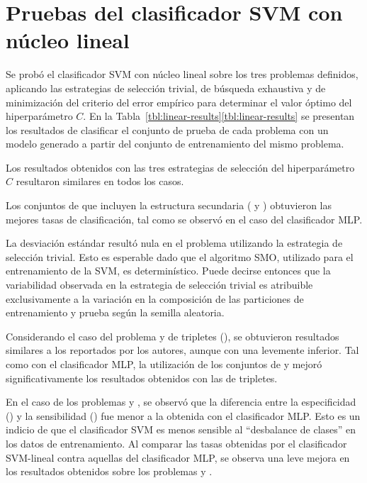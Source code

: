 %
%
%
\section{Pruebas del clasificador SVM con núcleo lineal}
%
Se probó el clasificador SVM con núcleo lineal sobre los tres
problemas definidos, aplicando las estrategias de selección trivial,
de búsqueda exhaustiva y de minimización del criterio del error
empírico para determinar el valor óptimo del hiperparámetro $C$.
En la \iflatexml{}Tabla~\ref{tbl:linear-results}\else\autoref{tbl:linear-results}\fi{}
se presentan los resultados de clasificar el conjunto de prueba de
cada problema con un modelo generado a partir del conjunto de
entrenamiento del mismo problema.

Los resultados obtenidos con las tres estrategias de selección del
hiperparámetro $C$ resultaron similares en todos los casos.

Los conjuntos de  que incluyen la estructura secundaria
( y ) obtuvieron las mejores tasas de clasificación,
tal como se observó en el caso del clasificador MLP.

La desviación estándar resultó nula en el problema \prob{\tripletsvm}
utilizando la estrategia de selección trivial.
Esto es esperable dado que el algoritmo SMO, utilizado para el
entrenamiento de la SVM, es determinístico.
Puede decirse entonces que la variabilidad observada en la estrategia
de selección trivial es atribuible exclusivamente a la variación en la
composición de las particiones de entrenamiento y prueba según la
semilla aleatoria.

Considerando el caso del problema \prob\tripletsvm{} y  de
tripletes (), se obtuvieron resultados similares a los
reportados por los autores, aunque con una \SP{} levemente inferior.
Tal como con el clasificador MLP, la utilización de los conjuntos de
  y  mejoró significativamente los
resultados obtenidos con las  de tripletes.

En el caso de los problemas \prob\mipred{} y \prob\micropred{}, se
observó que la diferencia entre la especificidad (\SP) y la
sensibilidad (\SE) fue menor a la obtenida con el clasificador MLP.
Esto es un indicio de que el clasificador SVM es menos sensible al
``desbalance de clases'' en los datos de entrenamiento.
Al comparar las tasas obtenidas por el clasificador SVM-lineal contra
aquellas del clasificador MLP, se observa una leve mejora en los
resultados obtenidos sobre los problemas \prob\mipred{} y
\prob\micropred{}.
